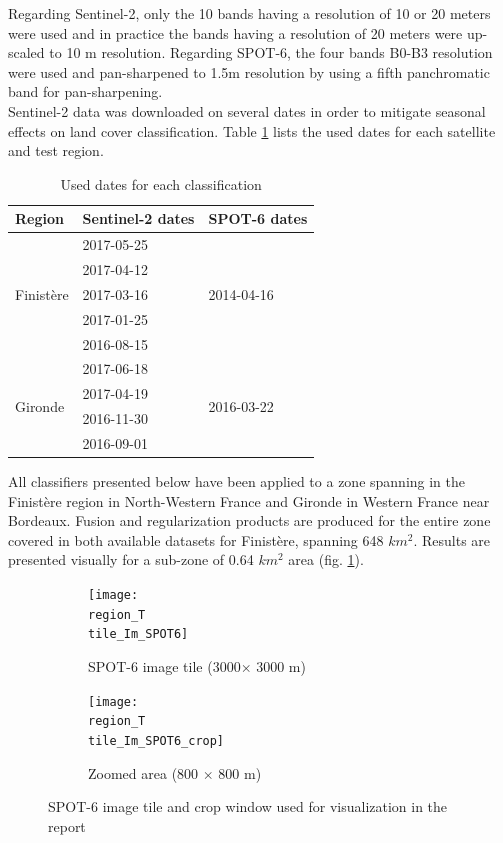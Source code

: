 \documentclass[10pt]{article}
\newcommand{\tile}{41000_30000}
\newcommand{\region}{finistere}
\begin{document}
Regarding Sentinel-2, only the 10 bands having a resolution of 10 or 20 meters were used and in practice the bands having a resolution of 20 meters were up-scaled to 10 m resolution. Regarding SPOT-6, the four bands B0-B3 resolution were used and pan-sharpened to 1.5m resolution by using a fifth panchromatic band for pan-sharpening. \\

Sentinel-2 data was downloaded on several dates in order to mitigate seasonal effects on land cover classification. Table \ref{table:dates} lists the used dates for each satellite and test region.
\begin{table}[H]
\centering
\begin{tabular}{lll}\toprule
Region & Sentinel-2 dates & SPOT-6 dates \\\hline
\multirow{5}{*}{Finistère} & 2017-05-25 & \multirow{5}{*}{2014-04-16} \\
 & 2017-04-12 &  \\
 & 2017-03-16 &  \\
 & 2017-01-25 &  \\
 & 2016-08-15 &  \\\hline
\multirow{4}{*}{Gironde} & 2017-06-18 & \multirow{4}{*}{2016-03-22} \\
 & 2017-04-19 &  \\
 & 2016-11-30 &  \\
 & 2016-09-01 &  \\\bottomrule
\end{tabular}
\caption{Used dates for each classification}
\label{table:dates}
\end{table}

All classifiers presented below have been applied to a zone spanning in the Finistère region in North-Western France and Gironde in Western France near Bordeaux. Fusion and regularization products are produced for the entire zone covered in both available datasets for Finistère, spanning 648 $km^2$. Results are presented visually for a sub-zone of 0.64 $km^2$ area (fig.  \ref{fig:area\tile}).
\newcommand{\figureTile}{
\begin{figure}[H]
    \centering
    \begin{subfigure}{0.49\textwidth}
        \centering
        \texttt{[image: \\region\_T\\tile\_Im\_SPOT6]}
        \caption{SPOT-6 image tile (3000$\times$ 3000 m)}
    \end{subfigure}
    \hfill
    \begin{subfigure}{0.49\textwidth}
        \centering
        \texttt{[image: \\region\_T\\tile\_Im\_SPOT6\_crop]}
        \caption{Zoomed area (800 $\times$ 800 m)}
    \end{subfigure}
    \caption{SPOT-6 image tile and crop window used for visualization in the report}
    \label{fig:area\tile}
    \centering
\end{figure}
}
\figureTile
\end{document}
